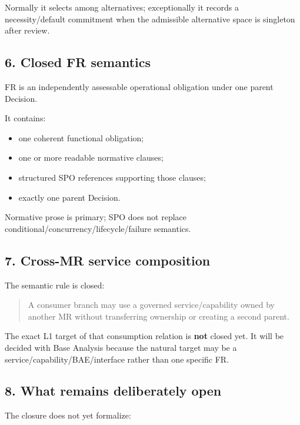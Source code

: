 \documentclass[
  10pt,
]{article}
\providecommand{\tightlist}{%
  \setlength{\itemsep}{0pt}\setlength{\parskip}{0pt}}
\begin{document}
Normally it selects among alternatives; exceptionally it records a
necessity/default commitment when the admissible alternative space is
singleton after review.

\subsection{6. Closed FR semantics}\label{6-closed-fr-semantics}

FR is an independently assessable operational obligation under one
parent Decision.

It contains:

\begin{itemize}
\tightlist
\item
  one coherent functional obligation;
\item
  one or more readable normative clauses;
\item
  structured SPO references supporting those clauses;
\item
  exactly one parent Decision.
\end{itemize}

Normative prose is primary; SPO does not replace
conditional/concurrency/lifecycle/failure semantics.

\subsection{7. Cross-MR service
composition}\label{7-cross-mr-service-composition}

The semantic rule is closed:

\begin{quote}
A consumer branch may use a governed service/capability owned by another
MR without transferring ownership or creating a second parent.
\end{quote}

The exact L1 target of that consumption relation is \textbf{not} closed
yet. It will be decided with Base Analysis because the natural target
may be a service/capability/BAE/interface rather than one specific FR.

\subsection{8. What remains deliberately
open}\label{8-what-remains-deliberately-open}

The closure does not yet formalize:
\end{document}
